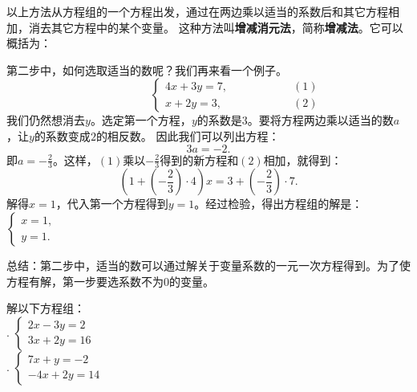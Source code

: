 \documentclass[12pt,UTF8]{ctexbook}
\begin{document}
以上方法从方程组的一个方程出发，通过在两边乘以适当的系数后和其它方程相加，消去其它方程中的某个变量。
这种方法叫\textbf{增减消元法}，简称\textbf{增减法}。它可以概括为：
\begin{center}
\end{center}

第二步中，如何选取适当的数呢？我们再来看一个例子。
$$ \quad \quad \quad \quad \quad\left\{
\begin{array}{cr}
     4x + 3y = 7, & \quad \quad \quad \quad \quad (1) \\
     x + 2y = 3, & \quad \quad \quad \quad \quad (2)
\end{array}\right.
$$
我们仍然想消去$y$。选定第一个方程，$y$的系数是$3$。要将方程两边乘以适当的数$a$，让$y$的系数变成$2$的相反数。
因此我们可以列出方程：
$$ 3a = -2.$$
即$a = -\frac{2}{3}$。这样，$(1)$乘以$-\frac23$得到的新方程和$(2)$相加，就得到：
$$ \left(1 + (-\frac{2}{3}) \cdot 4\right) x = 3 + (-\frac{2}{3}) \cdot 7.$$
解得$x = 1$，代入第一个方程得到$y = 1$。经过检验，得出方程组的解是：$\left\{ \begin{array}{c}
    x = 1, \\
    y = 1.
\end{array}\right.$

总结：第二步中，适当的数可以通过解关于变量系数的一元一次方程得到。为了使方程有解，第一步要选系数不为$0$的变量。

\begin{xt}\label{xt:6-1-0}
    解以下方程组：\\
    . $ \left\{
        \begin{array}{cr}
             2x - 3y = 2\\
             3x + 2y = 16
        \end{array}\right.
        $ \\
    . $\left\{
        \begin{array}{cr}
                7x + y = -2\\
                -4x + 2y = 14
        \end{array}\right.
        $ 
\end{xt}
\end{document}
